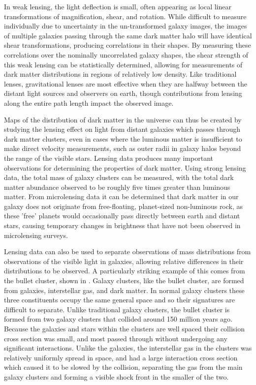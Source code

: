 In weak lensing, the light deflection is small, often appearing as local linear transformations of magnification, shear, and rotation. 
While difficult to measure individually due to uncertainty in the un-transformed galaxy images, the images of multiple galaxies passing through the same dark matter halo will have identical shear transformations, producing correlations in their shapes.
By measuring these correlations over the nominally uncorrelated galaxy shapes, the shear strength of this weak lensing can be statistically determined, allowing for measurements of dark matter distributions in regions of relatively low density.
Like traditional lenses, gravitational lenses are most effective when they are halfway between the distant light sources and observers on earth, though contributions from lensing along the entire path length impact the observed image.

Maps of the distribution of dark matter in the universe can thus be created by studying the lensing effect on light from distant galaxies which passes through dark matter clusters, even in cases where the luminous matter is insufficient to make direct velocity measurements, such as outer radii in galaxy halos beyond the range of the visible stars.
Lensing data produces many important observations for determining the properties of dark matter.
Using strong lensing data, the total mass of galaxy clusters can be measured, with the total dark matter abundance observed to be roughly five times greater than luminous matter.
From microlensing data it can be determined that dark matter in our galaxy does not originate from free-floating, planet-sized non-luminous rock, as these 'free' planets would occasionally pass directly between earth and distant stars, causing temporary changes in brightness that have not been observed in microlensing surveys.

Lensing data can also be used to separate observations of mass distributions from observations of the visible light in galaxies, allowing relative differences in their distributions to be observed. 
A particularly striking example of this comes from the bullet cluster, shown in . 
Galaxy clusters, like the bullet cluster, are formed from galaxies, interstellar gas, and dark matter.
In normal galaxy clusters these three constituents occupy the same general space and so their signatures are difficult to separate.
Unlike traditional galaxy clusters, the bullet cluster is formed from two galaxy clusters that collided around 150 million years ago. 
Because the galaxies and stars within the clusters are well spaced their collision cross section was small, and most passed through without undergoing any significant interactions.
Unlike the galaxies, the interstellar gas in the clusters was relatively uniformly spread in space, and had a large interaction cross section which caused it to be slowed by the collision, separating the gas from the main galaxy clusters and forming a visible shock front in the smaller of the two.

